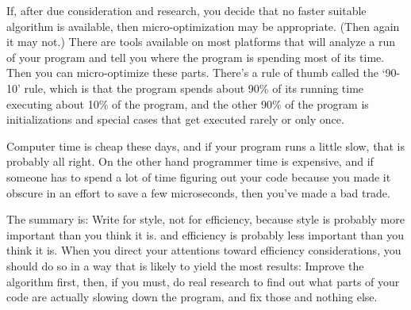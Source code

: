 If, after due consideration and research, you decide that no faster
suitable algorithm is available, then micro-optimization may be
appropriate. (Then again it may not.)  There are tools available on most
platforms that will analyze a run of your program and tell you where the
program is spending most of its time.  Then you can micro-optimize these
parts.  There's a rule of thumb called the `90-10' rule, which is that
the program spends about 90\% of its running time executing about 10\%
of the program, and the other 90\% of the program is initializations and
special cases that get executed rarely or only once.  

Computer time is cheap these days, and if your program runs a little
slow, that is probably all right.  On the other hand programmer time is
expensive, and if someone has to spend a lot of time figuring out your
code because you made it obscure in an effort to save a few
microseconds, then you've made a bad trade.

The summary is: Write for style, not for efficiency, because style is
probably more important than you think it is. and efficiency is probably
less important than you think it is.  When you direct your attentions
toward efficiency considerations, you should do so in a way that is
likely to yield the most results: Improve the algorithm first, then, if
you must, do real research to find out what parts of your code are
actually slowing down the program, and fix those and nothing else.




